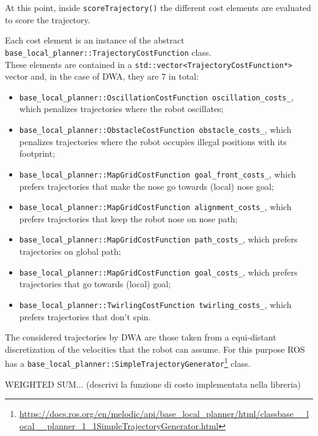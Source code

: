 \documentclass[11pt,a4paper]{article}
\begin{document}
At this point, inside \texttt{scoreTrajectory()} the different cost elements are evaluated to score the trajectory.

Each cost element is an instance of the abstract \texttt{base\_local\_planner::TrajectoryCostFunction} class.\\

These elements are contained in a \texttt{std::vector<TrajectoryCostFunction*>} vector and, in the case of DWA, they are
7 in total:

\begin{itemize}
    \item \texttt{base\_local\_planner::OscillationCostFunction oscillation\_costs\_}, which penalizes trajectories where the robot oscillates;
    \item \texttt{base\_local\_planner::ObstacleCostFunction obstacle\_costs\_}, which penalizes trajectories where the robot occupies illegal positions with its footprint;
    \item \texttt{base\_local\_planner::MapGridCostFunction goal\_front\_costs\_}, which prefers  trajectories that make the nose go towards (local) nose goal;
    \item \texttt{base\_local\_planner::MapGridCostFunction alignment\_costs\_}, which prefers trajectories that keep the robot nose on nose path;
    \item \texttt{base\_local\_planner::MapGridCostFunction path\_costs\_}, which prefers trajectories on global path;
    \item \texttt{base\_local\_planner::MapGridCostFunction goal\_costs\_}, which prefers trajectories that go towards (local) goal;
    \item \texttt{base\_local\_planner::TwirlingCostFunction twirling\_costs\_}, which prefers trajectories that don't spin.\\
\end{itemize}

The considered trajectories by DWA are those taken from a equi-distant discretization of the velocities that the robot can assume. For this purpose ROS has a \texttt{base\_local\_planner::SimpleTrajectoryGenerator}\footnote{\href{https://docs.ros.org/en/melodic/api/base\_local\_planner/html/classbase\_\_local\_\_planner\_1\_1SimpleTrajectoryGenerator.html}{https://docs.ros.org/en/melodic/api/base\_local\_planner/html/classbase\_\_local\_\_planner\_1\_1SimpleTrajectoryGenerator.html}} class.


WEIGHTED SUM... (descrivi la funzione di costo implementata nella libreria)
\end{document}
